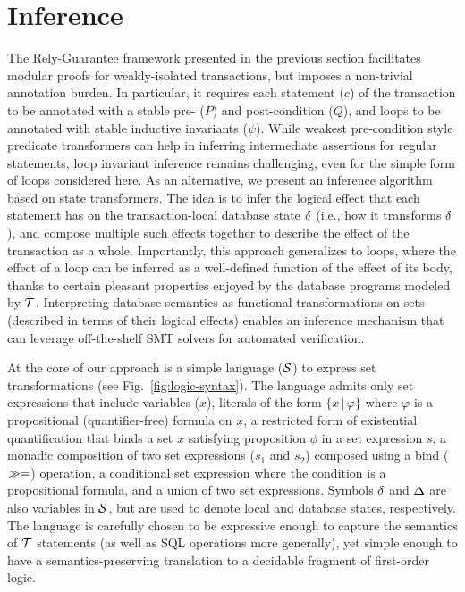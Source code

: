 \section{Inference}
\label{sec:inference}

The Rely-Guarantee framework presented in the previous section
facilitates modular proofs for weakly-isolated transactions, but
imposes a non-trivial annotation burden.  In particular, it requires
each statement ($c$) of the transaction to be annotated with a stable
pre- ($P$) and post-condition ($Q$), and loops to be annotated with
stable inductive invariants ($\psi$). While weakest pre-condition
style predicate transformers can help in inferring intermediate
assertions for regular statements, loop invariant inference remains
challenging, even for the simple form of loops considered here.  As an
alternative, we present an inference algorithm based on state
transformers.  The idea is to infer the logical effect that each
statement has on the transaction-local database state $\delta$ (i.e.,
how it transforms $\delta$), and compose multiple such effects together
to describe the effect of the transaction as a whole.  Importantly,
this approach generalizes to loops, where the effect of a loop can be
inferred as a well-defined function of the effect of its body, thanks
to certain pleasant properties enjoyed by the database programs
modeled by $\mbox{${\mathcal T}$}$.  Interpreting database semantics as functional
transformations on sets (described in terms of their logical effects)
enables an inference mechanism that can leverage off-the-shelf SMT
solvers for automated verification.



At the core of our approach is a simple language ($\mathcal{S}$) to express
set transformations (see Fig.~\ref{fig:logic-syntax}). The language
admits only set expressions that include variables ($x$), literals of
the form $\{x \,|\, \varphi\}$ where $\varphi$ is a propositional
(quantifier-free) formula on $x$, a restricted form of existential
quantification that binds a set $x$ satisfying proposition $\phi$ in a
set expression $s$, a monadic composition of two set expressions
($s_1$ and $s_2$) composed using a bind ($\gg=$) operation, a
conditional set expression where the condition is a propositional
formula, and a union of two set expressions. Symbols $\delta$ and $\Delta$
are also variables in $\mathcal{S}$, but are used to denote local and database
states, respectively.  The language is carefully chosen to be
expressive enough to capture the semantics of $\mbox{${\mathcal T}$}$ statements (as
well as SQL operations more generally), yet simple enough to have a
semantics-preserving translation to a decidable fragment of
first-order logic.

